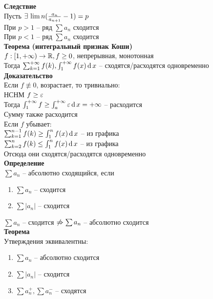 \documentclass[12pt]{article}
\begin{document}
\textbf{Следствие}\\
Пусть $\exists\, \lim n(\frac{a_n}{a_{n+1}}-1) = p$\\
При $p > 1$ -- ряд $\sum a_n$ сходится\\
При $p < 1$ -- ряд $\sum a_n$ сходится\\
\textbf{Теорема (интегральный признак Коши)}\\
$f: [1, +\infty) \rightarrow \mathbb{R}, f \geq 0$, непрерывная, монотонная\\
Тогда $\sum_{k=1}^{+\infty} f(k), \int_1^{+\infty} f(x)\operatorname{d} x$ -- сходятся/расходятся одновременно\\
\textbf{Доказательство}\\
Если $f\not\equiv0$, возрастает, то тривиально:\\
НСНМ $f \geq \varepsilon$\\
Тогда $\int_1^{+\infty} f \geq \int_a^{+\infty} \varepsilon \operatorname{d} x = +\infty$ -- расходится\\
Сумму также расходится\\
Если $f$ убывает:\\
$\sum_{k=1}^{n-1} f(k) \geq \int_1^n f(x)\operatorname{d} x$ -- из графика\\
$\sum_{k=2}^n f(k) \leq \int_1^n f(x)\operatorname{d} x$ -- из графика\\
Отсюда они сходятся/расходятся одновременно\\
\textbf{Определение}\\
$\sum a_n$ -- абсолютно сходящийся, если
\begin{enumerate}
    \item $\sum a_n$ -- сходится
    \item $\sum |a_n|$ -- сходится
\end{enumerate}
$\sum a_n$ -- сходится $\not\Rightarrow \sum a_n$ -- абсолютно сходится\\
\textbf{Теорема}\\
Утверждения эквивалентны:
\begin{enumerate}
    \item $\sum a_n$ -- абсолютно сходится
    \item $\sum |a_n|$ -- сходится
    \item $\sum a_n^+, \sum a_n^-$ -- сходятся
\end{enumerate}
\end{document}
